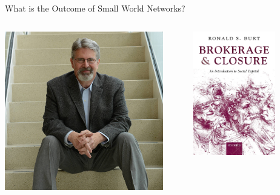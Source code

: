 \documentclass[aspectratio=1610]{beamer}
\begin{document}
\begin{frame}{What is the Outcome of Small World Networks?}
	\centering
	\begin{columns}
		\begin{column}{0.5\textwidth}
			\includegraphics[width=0.9\textwidth]{images/ron_burt.jpeg}
		\end{column}
		\begin{column}{0.5\textwidth}
			\includegraphics[width=0.7\textwidth]{images/brokerage_and_closure.jpeg}
		\end{column}
	\end{columns}
\end{frame}
\end{document}
